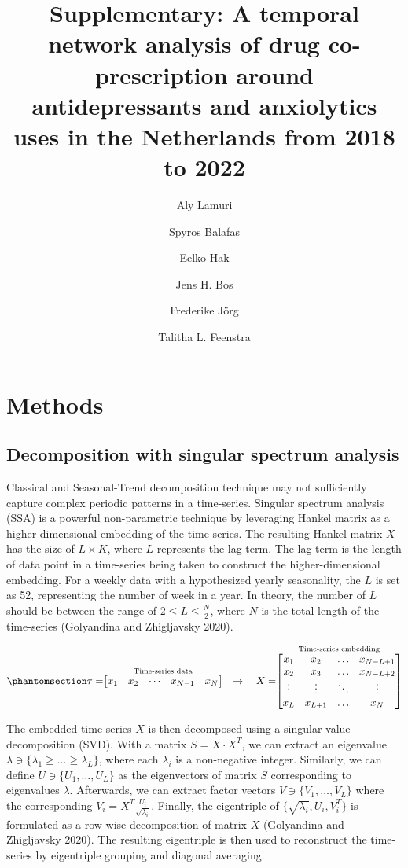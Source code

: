 \documentclass[
  letterpaper,
  DIV=11,
  numbers=noendperiod]{scrartcl}
\title{Supplementary: A temporal network analysis of drug
co-prescription around antidepressants and anxiolytics uses in the
Netherlands from 2018 to 2022}
\author{Aly Lamuri \and Spyros Balafas \and Eelko Hak \and Jens H.
Bos \and Frederike Jörg \and Talitha L. Feenstra}
\date{}
\begin{document}
\maketitle


\section{Methods}\label{methods}

\subsection{Decomposition with singular spectrum
analysis}\label{decomposition-with-singular-spectrum-analysis}

Classical and Seasonal-Trend decomposition technique may not
sufficiently capture complex periodic patterns in a time-series.
Singular spectrum analysis (SSA) is a powerful non-parametric technique
by leveraging Hankel matrix as a higher-dimensional embedding of the
time-series. The resulting Hankel matrix \(X\) has the size of
\(L \times K\), where \(L\) represents the lag term. The lag term is the
length of data point in a time-series being taken to construct the
higher-dimensional embedding. For a weekly data with a hypothesized
yearly seasonality, the \(L\) is set as 52, representing the number of
week in a year. In theory, the number of \(L\) should be between the
range of \(2 \leq L \leq \frac{N}{2}\), where \(N\) is the total length
of the time-series (Golyandina and Zhigljavsky 2020).

\begin{equation}\phantomsection\label{eq-hankel-mtx}{
\tau =
\stackrel{\textrm{Time-series data}}{
  \begin{bmatrix}
  x_1 & x_2 & \cdots & x_{N-1} & x_N \\
  \end{bmatrix}
}
\quad \to \quad
X =
\stackrel{\textrm{Time-series embedding}}{
  \begin{bmatrix}
  x_1 & x_2 & \dots & x_{N - L + 1} \\
  x_2 & x_3 & \dots & x_{N - L + 2} \\
  \vdots & \vdots & \ddots & \vdots \\
  x_L & x_{L + 1} & \dots & x_{N} \\
  \end{bmatrix}
}
}\end{equation}

The embedded time-series \(X\) is then decomposed using a singular value
decomposition (SVD). With a matrix \(S = X \cdot X^T\), we can extract
an eigenvalue \(\lambda \ni \{\lambda_1 \geq \dots \geq \lambda_L\}\),
where each \(\lambda_i\) is a non-negative integer. Similarly, we can
define \(U \ni \{U_1, \dots, U_L\}\) as the eigenvectors of matrix \(S\)
corresponding to eigenvalues \(\lambda\). Afterwards, we can extract
factor vectors \(V \ni \{V_1, \dots, V_L\}\) where the corresponding
\(V_i = X^T \frac{U_i}{\sqrt{\lambda_i}}\). Finally, the eigentriple of
\(\{\sqrt{\lambda_i}, U_i, V_i^T\}\) is formulated as a row-wise
decomposition of matrix \(X\) (Golyandina and Zhigljavsky 2020). The
resulting eigentriple is then used to reconstruct the time-series by
eigentriple grouping and diagonal averaging.
\end{document}
